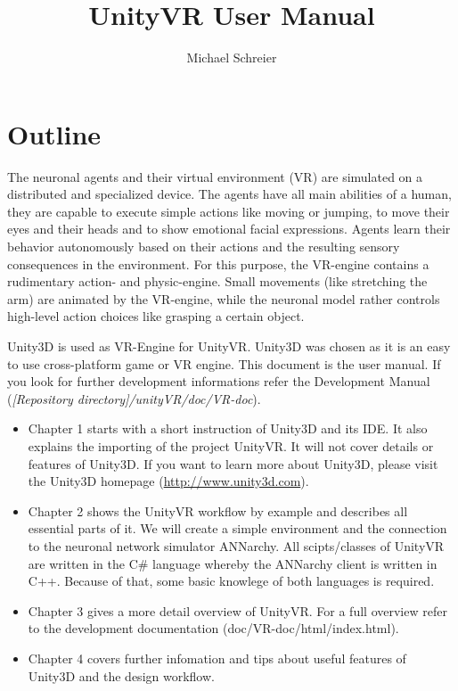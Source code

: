 \documentclass[10pt,final]{scrreprt}
\begin{document}
\title{UnityVR User Manual}
\author{Michael Schreier}
\maketitle

\tableofcontents
{}

\chapter*{Outline}
The neuronal agents and their virtual environment (VR) are simulated on a distributed and specialized device. The agents have all main abilities of a human, they are capable to execute simple actions like moving or jumping, to move their eyes and their heads and to show emotional facial expressions. Agents learn their behavior autonomously based on their actions and the resulting sensory consequences in the environment. For this purpose, the VR-engine contains a rudimentary action- and physic-engine. Small movements (like stretching the arm) are animated by the VR-engine, while the neuronal model rather controls high-level action choices like grasping a certain object.

Unity3D is used as VR-Engine for UnityVR. Unity3D was chosen as it is an easy to use cross-platform game or VR engine. This document is the user manual. If you look for further development informations refer the Development Manual (\emph{[Repository directory]/unityVR/doc/VR-doc}).  

\begin{itemize}
\item Chapter 1 starts with a short instruction of Unity3D and its IDE. It also explains the importing of the project UnityVR. It will not cover details or features of Unity3D. If  you want to learn more about Unity3D, please visit the Unity3D homepage (\url{http://www.unity3d.com}).

\item Chapter 2 shows the UnityVR workflow by example and describes all essential parts of it. We will create a simple environment and the connection to the neuronal network simulator ANNarchy. All scipts/classes of UnityVR are written in the C\# language whereby the ANNarchy client is written in C++. Because of that, some basic knowlege of both languages is required. 

\item Chapter 3 gives a more detail overview of UnityVR. For a full overview refer to the development documentation (doc/VR-doc/html/index.html).

\item Chapter 4 covers further infomation and tips about useful features of Unity3D and the design workflow.
\end{itemize}
\end{document}
